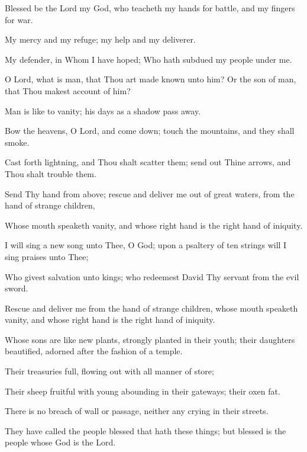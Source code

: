 Blessed be the Lord my God, who teacheth my hands for battle, and my fingers for war.

My mercy and my refuge; my help and my deliverer.

My defender, in Whom I have hoped; Who hath subdued my people under me.

O Lord, what is man, that Thou art made known unto him? Or the son of man, that Thou makest account of him?

Man is like to vanity; his days as a shadow pass away.

Bow the heavens, O Lord, and come down; touch the mountains, and they shall smoke.

Cast forth lightning, and Thou shalt scatter them; send out Thine arrows, and Thou shalt trouble them.

Send Thy hand from above; rescue and deliver me out of great waters, from the hand of strange children,

Whose mouth speaketh vanity, and whose right hand is the right hand of iniquity.

I will sing a new song unto Thee, O God; upon a psaltery of ten strings will I sing praises unto Thee;

Who givest salvation unto kings; who redeemest David Thy servant from the evil sword.

Rescue and deliver me from the hand of strange children, whose mouth speaketh vanity, and whose right hand is the right hand of iniquity.

Whose sons are like new plants, strongly planted in their youth; their daughters beautified, adorned after the fashion of a temple.

Their treasuries full, flowing out with all manner of store;

Their sheep fruitful with young abounding in their gateways; their oxen fat.

There is no breach of wall or passage, neither any crying in their streets.

They have called the people blessed that hath these things; but blessed is the people whose God is the Lord.
